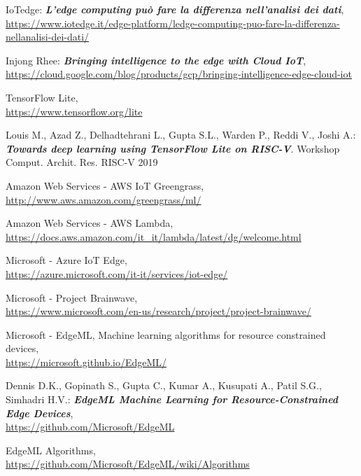 \documentclass[a4paper,12pt,oneside]{book}
\begin{document}
\clearpage
\pagestyle{plain}
\fancyfoot[R]{}
\begin{thebibliography}{26}
	\begin{spacing}{1.25}
	IoTedge: \textbf{\textit{L'edge computing può fare la differenza nell’analisi dei dati}},
	\\\url{https://www.iotedge.it/edge-platform/ledge-computing-puo-fare-la-differenza-nellanalisi-dei-dati/}
	
	Injong Rhee: \textbf{\textit{Bringing intelligence to the edge with Cloud IoT}},
	\\\url{https://cloud.google.com/blog/products/gcp/bringing-intelligence-edge-cloud-iot}
		
	TensorFlow Lite,
	\\\url{https://www.tensorflow.org/lite}
	
	Louis M., Azad Z., Delhadtehrani L., Gupta S.L., Warden P., Reddi V., Joshi A.: \textbf{\textit{Towards deep learning using TensorFlow Lite on RISC-V}}. Workshop Comput. Archit. Res. RISC-V 2019
	
	Amazon Web Services - AWS IoT Greengrass,
	\\\url{http://www.aws.amazon.com/greengrass/ml/}
	
	Amazon Web Services - AWS Lambda,
	\\\url{https://docs.aws.amazon.com/it_it/lambda/latest/dg/welcome.html}
	
	Microsoft - Azure IoT Edge,
	\\\url{https://azure.microsoft.com/it-it/services/iot-edge/}
	
	Microsoft - Project Brainwave,
	\\\url{https://www.microsoft.com/en-us/research/project/project-brainwave/}
	
	Microsoft - EdgeML, Machine learning algorithms for resource constrained devices,
	\\\url{https://microsoft.github.io/EdgeML/}
	
	Dennis D.K., Gopinath S., Gupta C., Kumar A., Kusupati A., Patil S.G., Simhadri H.V.: \textbf{\textit{EdgeML Machine Learning for Resource-Constrained Edge Devices}},
	\\\url{https://github.com/Microsoft/EdgeML}
	
	EdgeML Algorithms,
	\\\url{https://github.com/Microsoft/EdgeML/wiki/Algorithms}
	

\end{spacing}
\end{thebibliography}
\end{document}

